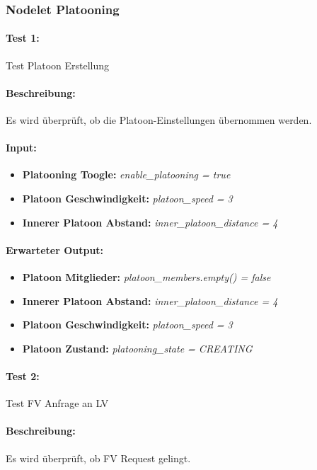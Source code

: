 \documentclass[a4paper, 12pt, titlepage]{scrartcl}
\begin{document}
			\subsubsection{Nodelet Platooning}
			\label{node_platooning}
			\paragraph{Test 1:}{Test Platoon Erstellung}
			\paragraph{Beschreibung:} Es wird überprüft, ob die Platoon-Einstellungen übernommen werden.
			\paragraph{Input:}
			\begin{itemize} \itemsep-0.5em
				\item \textbf{Platooning Toogle:} \emph{enable\_platooning = true}
				\item \textbf{Platoon Geschwindigkeit:} \emph{platoon\_speed = 3}
				\item \textbf{Innerer Platoon Abstand:} \emph{inner\_platoon\_distance = 4}
			\end{itemize}
			\paragraph{Erwarteter Output:}
			\begin{itemize} \itemsep-0.5em
				\item \textbf{Platoon Mitglieder:} \emph{platoon\_members.empty() = false}
				\item \textbf{Innerer Platoon Abstand:} \emph{inner\_platoon\_distance = 4}
				\item \textbf{Platoon Geschwindigkeit:} \emph{platoon\_speed = 3}
				\item \textbf{Platoon Zustand:} \emph{platooning\_state = CREATING}
			\end{itemize}

			\paragraph{Test 2:}{Test FV Anfrage an LV}
			\paragraph{Beschreibung:} Es wird überprüft, ob FV Request gelingt.
\end{document}
